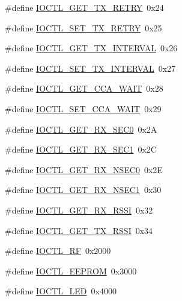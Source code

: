 \begin{DoxyCompactItemize}
\item 
\#define \hyperlink{drv-lazurite_8h_aaff8de18db7b38d0126c69c3703d1074}{I\+O\+C\+T\+L\+\_\+\+G\+E\+T\+\_\+\+T\+X\+\_\+\+R\+E\+T\+R\+Y}~0x24
\item 
\#define \hyperlink{drv-lazurite_8h_ae7ce7259f51ffc9bfadc1d67f0fbfe27}{I\+O\+C\+T\+L\+\_\+\+S\+E\+T\+\_\+\+T\+X\+\_\+\+R\+E\+T\+R\+Y}~0x25
\item 
\#define \hyperlink{drv-lazurite_8h_a03aef28ce29dc9240506b75ffa0e7425}{I\+O\+C\+T\+L\+\_\+\+G\+E\+T\+\_\+\+T\+X\+\_\+\+I\+N\+T\+E\+R\+V\+A\+L}~0x26
\item 
\#define \hyperlink{drv-lazurite_8h_ae4fdf55cabb5920142aff7a2827221c6}{I\+O\+C\+T\+L\+\_\+\+S\+E\+T\+\_\+\+T\+X\+\_\+\+I\+N\+T\+E\+R\+V\+A\+L}~0x27
\item 
\#define \hyperlink{drv-lazurite_8h_a7617895c9272b7e5cb6f1006b438bf1f}{I\+O\+C\+T\+L\+\_\+\+G\+E\+T\+\_\+\+C\+C\+A\+\_\+\+W\+A\+I\+T}~0x28
\item 
\#define \hyperlink{drv-lazurite_8h_a09864254d89814edd9d280ba5cf40762}{I\+O\+C\+T\+L\+\_\+\+S\+E\+T\+\_\+\+C\+C\+A\+\_\+\+W\+A\+I\+T}~0x29
\item 
\#define \hyperlink{drv-lazurite_8h_a865b9ae5a4a8f9287888772387777b31}{I\+O\+C\+T\+L\+\_\+\+G\+E\+T\+\_\+\+R\+X\+\_\+\+S\+E\+C0}~0x2\+A
\item 
\#define \hyperlink{drv-lazurite_8h_a4d34cba99c31918b300244e9b125b383}{I\+O\+C\+T\+L\+\_\+\+G\+E\+T\+\_\+\+R\+X\+\_\+\+S\+E\+C1}~0x2\+C
\item 
\#define \hyperlink{drv-lazurite_8h_a07297c68cae325d8a7e1d2ded46f7081}{I\+O\+C\+T\+L\+\_\+\+G\+E\+T\+\_\+\+R\+X\+\_\+\+N\+S\+E\+C0}~0x2\+E
\item 
\#define \hyperlink{drv-lazurite_8h_a3833f2ffa7d550a32efa2ec4c17c909f}{I\+O\+C\+T\+L\+\_\+\+G\+E\+T\+\_\+\+R\+X\+\_\+\+N\+S\+E\+C1}~0x30
\item 
\#define \hyperlink{drv-lazurite_8h_a9955208bd30cc610bedd74e8a1a45cb2}{I\+O\+C\+T\+L\+\_\+\+G\+E\+T\+\_\+\+R\+X\+\_\+\+R\+S\+S\+I}~0x32
\item 
\#define \hyperlink{drv-lazurite_8h_abb5fc554107394ddf1a1a3e9ebc3563d}{I\+O\+C\+T\+L\+\_\+\+G\+E\+T\+\_\+\+T\+X\+\_\+\+R\+S\+S\+I}~0x34
\item 
\#define \hyperlink{drv-lazurite_8h_a96a4cea6c35aebe38494a4d9c0017fe8}{I\+O\+C\+T\+L\+\_\+\+R\+F}~0x2000
\item 
\#define \hyperlink{drv-lazurite_8h_a69b62f92473f26d58afc003e3c13eb4d}{I\+O\+C\+T\+L\+\_\+\+E\+E\+P\+R\+O\+M}~0x3000
\item 
\#define \hyperlink{drv-lazurite_8h_a658a2d5320a26eb469a592edbd633258}{I\+O\+C\+T\+L\+\_\+\+L\+E\+D}~0x4000
\end{DoxyCompactItemize}


